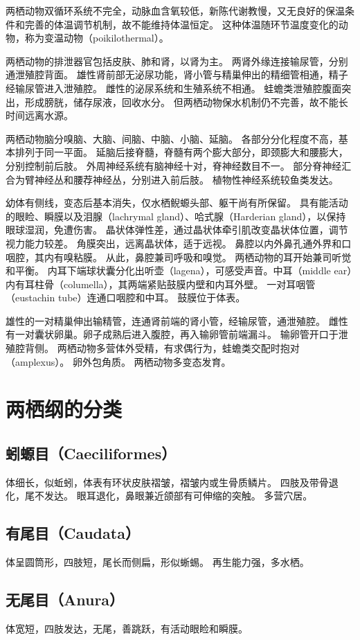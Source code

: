 \documentclass[11pt]{article}
\begin{document}
\newline

两栖动物双循环系统不完全，动脉血含氧较低，新陈代谢教慢，又无良好的保温条件和完善的体温调节机制，故不能维持体温恒定。
这种体温随环节温度变化的动物，称为变温动物（poikilothermal）。

\newline

两栖动物的排泄器官包括皮肤、肺和肾，以肾为主。
两肾外缘连接输尿管，分别通泄殖腔背面。
雄性肾前部无泌尿功能，肾小管与精巢伸出的精细管相通，精子经输尿管进入泄殖腔。
雌性的泌尿系统和生殖系统不相通。
蛙蟾类泄殖腔腹面突出，形成膀胱，储存尿液，回收水分。
但两栖动物保水机制仍不完善，故不能长时间远离水源。

\newline

两栖动物脑分嗅脑、大脑、间脑、中脑、小脑、延脑。
各部分分化程度不高，基本排列于同一平面。
延脑后接脊髓，脊髓有两个膨大部分，即颈膨大和腰膨大，分别控制前后肢。
外周神经系统有脑神经十对，脊神经数目不一。
部分脊神经汇合为臂神经丛和腰荐神经丛，分别进入前后肢。
植物性神经系统较鱼类发达。

\newline

幼体有侧线，变态后基本消失，仅水栖鲵螈头部、躯干尚有所保留。
具有能活动的眼睑、瞬膜以及泪腺（lachrymal gland）、哈式腺（Harderian gland），以保持眼球湿润，免遭伤害。
晶状体弹性差，通过晶状体牵引肌改变晶状体位置，调节视力能力较差。
角膜突出，远离晶状体，适于远视。
鼻腔以内外鼻孔通外界和口咽腔，其内有嗅粘膜。
从此，鼻腔兼司呼吸和嗅觉。
两栖动物的耳开始兼司听觉和平衡。
内耳下端球状囊分化出听壶（lagena），可感受声音。中耳（middle ear）内有耳柱骨（columella），其两端紧贴鼓膜内壁和内耳外壁。
一对耳咽管（eustachin tube）连通口咽腔和中耳。
鼓膜位于体表。

\newline

雄性的一对精巢伸出输精管，连通肾前端的肾小管，经输尿管，通泄殖腔。
雌性有一对囊状卵巢。卵子成熟后进入腹腔，再入输卵管前端漏斗。
输卵管开口于泄殖腔背侧。
两栖动物多营体外受精，有求偶行为，蛙蟾类交配时抱对（amplexus）。
卵外包角质。
两栖动物多变态发育。

\section{两栖纲的分类}
\subsection{蚓螈目（Caeciliformes）}
体细长，似蚯蚓，体表有环状皮肤褶皱，褶皱内或生骨质鳞片。
四肢及带骨退化，尾不发达。
眼耳退化，鼻眼兼近颌部有可伸缩的突触。
多营穴居。

\subsection{有尾目（Caudata）}
体呈圆筒形，四肢短，尾长而侧扁，形似蜥蜴。
再生能力强，多水栖。

\subsection{无尾目（Anura）}
体宽短，四肢发达，无尾，善跳跃，有活动眼睑和瞬膜。
\end{document}
